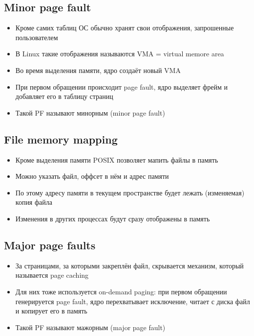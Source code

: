     \subsection{Minor page fault}
      \begin{itemize}
        \item Кроме самих таблиц ОС обычно хранят свои отображения, запрошенные пользователем
        \item В Linux такие отображения называются VMA = virtual memore area
        \item Во время выделения памяти, ядро создаёт новый VMA
        \item При первом обращении происходит page fault, ядро выделяет фрейм и добавляет его в таблицу страниц
        \item Такой PF называют минорным (minor page fault)
      \end{itemize}
    
    \subsection{File memory mapping}
      \begin{itemize}
        \item Кроме выделения памяти POSIX позволяет мапить файлы в память
        \item Можно указать файл, оффсет в нём и адрес памяти
        \item По этому адресу памяти в текущем пространстве будет лежать (изменяемая) копия файла
        \item Изменения в других процессах будут сразу отображены в память
      \end{itemize}
    
    \subsection{Major page faults}
      \begin{itemize}
        \item За страницами, за которыми закреплён файл, скрывается механизм, который называется page caching
        \item Для них тоже используется on-demand paging: при первом обращении генерируется page fault, ядро перехватывает исключение, читает с диска файл и копирует его в память
        \item Такой PF называют мажорным (major page fault)
      \end{itemize}
    
